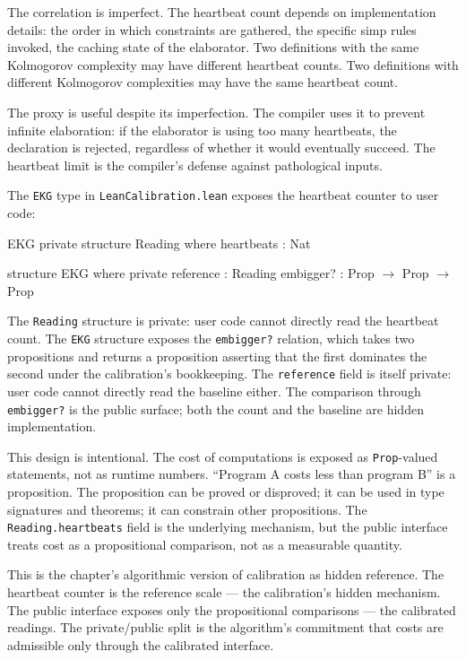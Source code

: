 The correlation is imperfect. The heartbeat count depends on
implementation details: the order in which constraints are gathered,
the specific simp rules invoked, the caching state of the
elaborator. Two definitions with the same Kolmogorov complexity may
have different heartbeat counts. Two definitions with different
Kolmogorov complexities may have the same heartbeat count.

The proxy is useful despite its imperfection. The compiler uses it
to prevent infinite elaboration: if the elaborator is using too many
heartbeats, the declaration is rejected, regardless of whether it
would eventually succeed. The heartbeat limit is the compiler's
defense against pathological inputs.

The \texttt{EKG} type in \texttt{LeanCalibration.lean} exposes the
heartbeat counter to user code:

\begin{leanexcerpt}{EKG}
private structure Reading where
  heartbeats : Nat

structure EKG where
  private reference : Reading
  embigger? : Prop $\to$ Prop $\to$ Prop
\end{leanexcerpt}

The \texttt{Reading} structure is private: user code cannot
directly read the heartbeat count. The \texttt{EKG} structure
exposes the \texttt{embigger?} relation, which takes two
propositions and returns a proposition asserting that the first
dominates the second under the calibration's bookkeeping. The
\texttt{reference} field is itself private: user code cannot
directly read the baseline either. The comparison through
\texttt{embigger?} is the public surface; both the count and the
baseline are hidden implementation.

This design is intentional. The cost of computations is exposed as
\texttt{Prop}-valued statements, not as runtime numbers. ``Program
A costs less than program B'' is a proposition. The proposition
can be proved or disproved; it can be used in type signatures and
theorems; it can constrain other propositions. The
\texttt{Reading.heartbeats} field is the underlying mechanism, but
the public interface treats cost as a propositional comparison, not
as a measurable quantity.

This is the chapter's algorithmic version of calibration as hidden
reference. The heartbeat counter is the reference scale --- the
calibration's hidden mechanism. The public interface exposes only
the propositional comparisons --- the calibrated readings. The
private/public split is the algorithm's commitment that costs are
admissible only through the calibrated interface.

